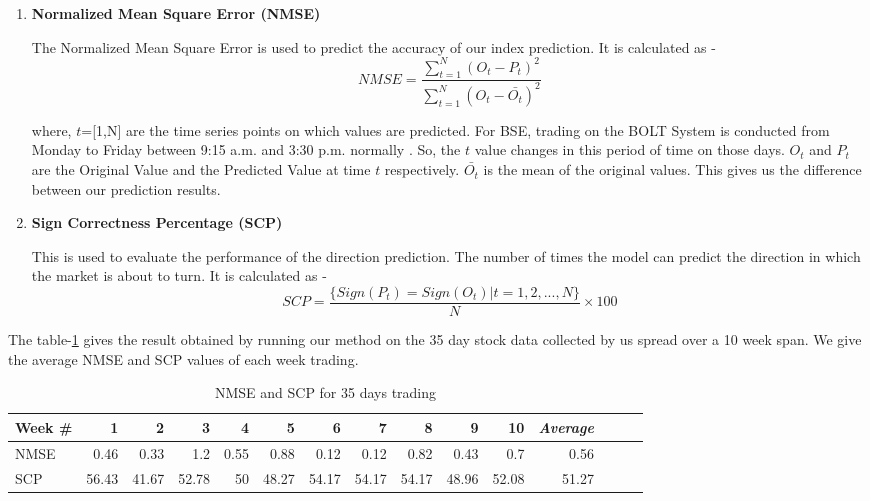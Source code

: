 \documentclass[a4paper,12bp]{report}
\begin{document}
\begin{enumerate}
\item \textbf{Normalized Mean Square Error (NMSE)}

The Normalized Mean Square Error is used to predict the accuracy of our index prediction. It is calculated as - 
\begin{equation}
NMSE = \frac{\sum_{t=1}^{N} (O_t - P_t)^2}{\sum_{t=1}^N (O_t - \bar{O_t})^2}
\end{equation}

where, $t$=[1,N] are the time series points on which values are predicted. For BSE, trading on the BOLT System is conducted from Monday to Friday between 9:15 a.m. and 3:30 p.m. normally \cite{bse_trade}. So, the $t$ value changes in this period of time on those days. $O_t$ and $P_t$ are the Original Value and the Predicted Value at time $t$ respectively. $\bar{O_t}$ is the mean of the original values. This gives us the difference between our prediction results.
\newpage
\item \textbf{Sign Correctness Percentage (SCP)}

This is used to evaluate the performance of the direction prediction. The number of times the model can predict the direction in which the market is about to turn. It is calculated as -
\begin{equation}
SCP = \frac{\{ Sign(P_t) = Sign(O_t) | t = 1,2,...,N\}}{N} \times 100
\end{equation}
\end{enumerate}

The table-\ref{tab:performance} gives the result obtained by running our method on the 35 day stock data collected by us spread over a 10 week span. We give the average NMSE and SCP values of each week trading. 

\begin{table}[ht]
\centering
\caption{NMSE and SCP for 35 days trading}
\label{tab:performance}
\vspace{15pt}
\begin{tabular}{|l|r|r|r|r|r|r|r|r|r|r|r|r|r|r|}
\hline
Week \# & 1 & 2 & 3 & 4 & 5 & 6 & 7 & 8 & 9 & 10 & \textit{Average} \\ \hline
NMSE  & 0.46 & 0.33 & 1.2 & 0.55 & 0.88 & 0.12 & 0.12 & 0.82 & 0.43 & 0.7 & 0.56 \\ \hline
SCP  & 56.43 & 41.67 & 52.78 & 50 & 48.27 & 54.17 & 54.17 & 54.17 & 48.96 & 52.08 & 51.27 \\ \hline
\end{tabular}
\end{table}
\end{document}
